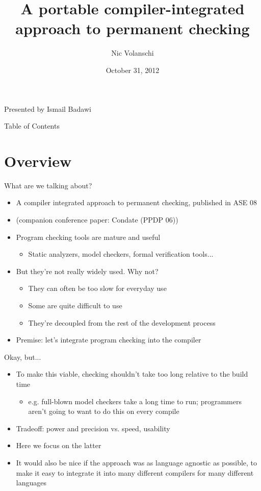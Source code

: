 \documentclass{beamer}
\title[A portable compiler-integrated approach to permanent checking]
{A portable compiler-integrated approach to permanent checking}
\date{October 31, 2012}
\author[Nic Volanschi]{Nic Volanschi}
\begin{document}

\begin{frame}
\nocite{NV}
\nocite{Unparsed}
\nocite{Condate}
\titlepage
\begin{center}
Presented by Ismail Badawi
\end{center}
\end{frame}

\begin{frame}{Table of Contents}
\tableofcontents
\end{frame}

\section{Overview}
\begin{frame}{What are we talking about?}
\begin{itemize}
\item A compiler integrated approach to permanent checking, published in ASE 08
\item (companion conference paper: Condate (PPDP 06))
\item Program checking tools are mature and useful
\begin{itemize}
\item Static analyzers, model checkers, formal verification tools...
\end{itemize}
\item But they're not really widely used. Why not?
\begin{itemize}
\item They can often be too slow for everyday use
\item Some are quite difficult to use
\item They're decoupled from the rest of the development process
\end{itemize}
\item Premise: let's integrate program checking into the compiler
\end{itemize}
\end{frame}

\begin{frame}{Okay, but...}
\begin{itemize}
\item To make this viable, checking shouldn't take too long relative to
the build time
\begin{itemize}
\item e.g. full-blown model checkers take a long time to run; 
programmers aren't going to want to do this on every compile
\end{itemize}
\item Tradeoff: power and precision vs. speed, usability
\item Here we focus on the latter
\item It would also be nice if the approach was as language agnostic as
possible, to make it easy to integrate it into many different compilers
for many different languages
\end{itemize}
\end{frame}
\end{document}
